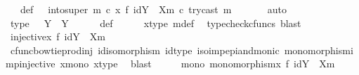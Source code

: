 \begin{isabellebody}
\ {\isasymphi}\ \ {\isasymphi}{\isacharunderscore}{\kern0pt}def{\isacharcolon}{\kern0pt}\ {\isachardoublequoteopen}{\isasymphi}\ {\isacharequal}{\kern0pt}\ into{\isacharunderscore}{\kern0pt}super\ m\ {\isasymcirc}\isactrlsub c\ {\isacharparenleft}{\kern0pt}x\ {\isasymbowtie}\isactrlsub f\ id{\isacharparenleft}{\kern0pt}Y\ {\isasymsetminus}\ {\isacharparenleft}{\kern0pt}X{\isacharcomma}{\kern0pt}m{\isacharparenright}{\kern0pt}{\isacharparenright}{\kern0pt}{\isacharparenright}{\kern0pt}\ {\isasymcirc}\isactrlsub c\ try{\isacharunderscore}{\kern0pt}cast\ m{\isachardoublequoteclose}\ \isanewline
\ \ \ \ \isamarkupfalse%
\ auto\isanewline
\isanewline
\ \ \isamarkupfalse%
\ {\isasymphi}{\isacharunderscore}{\kern0pt}type{\isacharcolon}{\kern0pt}\ {\isachardoublequoteopen}{\isasymphi}\ {\isacharcolon}{\kern0pt}\ Y\ {\isasymrightarrow}\ Y{\isachardoublequoteclose}\isanewline
\ \ \ \ \isamarkupfalse%
\ {\isasymphi}{\isacharunderscore}{\kern0pt}def\isanewline
\ \ \ \ \isamarkupfalse%
\ x{\isacharunderscore}{\kern0pt}type\ m{\isacharunderscore}{\kern0pt}def\ \isamarkupfalse%
\ {\isacharparenleft}{\kern0pt}typecheck{\isacharunderscore}{\kern0pt}cfuncs{\isacharcomma}{\kern0pt}\ blast{\isacharparenright}{\kern0pt}\isanewline
\isanewline
\ \ \isamarkupfalse%
\ {\isachardoublequoteopen}injective{\isacharparenleft}{\kern0pt}x\ {\isasymbowtie}\isactrlsub f\ id{\isacharparenleft}{\kern0pt}Y\ {\isasymsetminus}\ {\isacharparenleft}{\kern0pt}X{\isacharcomma}{\kern0pt}m{\isacharparenright}{\kern0pt}{\isacharparenright}{\kern0pt}{\isacharparenright}{\kern0pt}{\isachardoublequoteclose}\isanewline
\ \ \ \ \isamarkupfalse%
\ cfunc{\isacharunderscore}{\kern0pt}bowtieprod{\isacharunderscore}{\kern0pt}inj\ id{\isacharunderscore}{\kern0pt}isomorphism\ id{\isacharunderscore}{\kern0pt}type\ iso{\isacharunderscore}{\kern0pt}imp{\isacharunderscore}{\kern0pt}epi{\isacharunderscore}{\kern0pt}and{\isacharunderscore}{\kern0pt}monic\ monomorphism{\isacharunderscore}{\kern0pt}imp{\isacharunderscore}{\kern0pt}injective\ x{\isacharunderscore}{\kern0pt}mono\ x{\isacharunderscore}{\kern0pt}type\ \isamarkupfalse%
\ blast\isanewline
\ \ \isamarkupfalse%
\ \isamarkupfalse%
\ mono{}{\isacharcolon}{\kern0pt}\ {\isachardoublequoteopen}monomorphism{\isacharparenleft}{\kern0pt}x\ {\isasymbowtie}\isactrlsub f\ id{\isacharparenleft}{\kern0pt}Y\ {\isasymsetminus}\ {\isacharparenleft}{\kern0pt}X{\isacharcomma}{\kern0pt}m{\isacharparenright}{\kern0pt}{\isacharparenright}{\kern0pt}{\isacharparenright}{\kern0pt}{\isachardoublequoteclose}\isanewline

\end{isabellebody}
